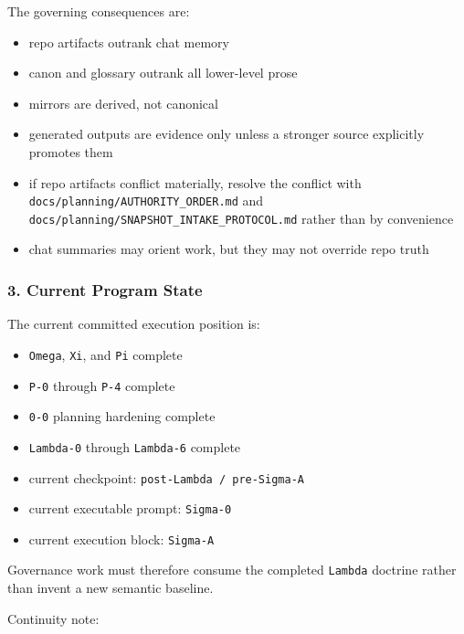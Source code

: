 \documentclass[9pt,a4paper,openany]{book}
\begin{document}
The governing consequences are:


\begin{itemize}
\item repo artifacts outrank chat memory
\item canon and glossary outrank all lower-\allowbreak{}level prose
\item mirrors are derived, not canonical
\item generated outputs are evidence only unless a stronger source explicitly promotes them
\item if repo artifacts conflict materially, resolve the conflict with \texttt{docs/\allowbreak{}planning/\allowbreak{}AUTHORITY\_\allowbreak{}ORDER.\allowbreak{}md} and \texttt{docs/\allowbreak{}planning/\allowbreak{}SNAPSHOT\_\allowbreak{}INTAKE\_\allowbreak{}PROTOCOL.\allowbreak{}md} rather than by convenience
\item chat summaries may orient work, but they may not override repo truth
\end{itemize}

\subsubsection{3. Current Program State}

The current committed execution position is:


\begin{itemize}
\item \texttt{Omega}, \texttt{Xi}, and \texttt{Pi} complete
\item \texttt{P-\allowbreak{}0} through \texttt{P-\allowbreak{}4} complete
\item \texttt{0-\allowbreak{}0} planning hardening complete
\item \texttt{Lambda-\allowbreak{}0} through \texttt{Lambda-\allowbreak{}6} complete
\item current checkpoint: \texttt{post-\allowbreak{}Lambda /\allowbreak{} pre-\allowbreak{}Sigma-\allowbreak{}A}
\item current executable prompt: \texttt{Sigma-\allowbreak{}0}
\item current execution block: \texttt{Sigma-\allowbreak{}A}
\end{itemize}

Governance work must therefore consume the completed \texttt{Lambda} doctrine rather than invent a new semantic baseline.\allowbreak{}


Continuity note:
\end{document}

